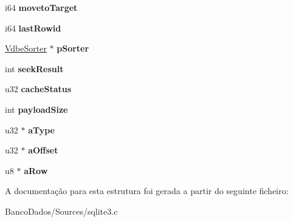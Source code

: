 \begin{DoxyCompactItemize}
\item 
\hypertarget{struct_vdbe_cursor_af3c157d480c0597ba50aca227eb8e3b8}{i64 {\bfseries moveto\-Target}}\label{struct_vdbe_cursor_af3c157d480c0597ba50aca227eb8e3b8}

\item 
\hypertarget{struct_vdbe_cursor_af2ff971acc308c012c60b1e949c64411}{i64 {\bfseries last\-Rowid}}\label{struct_vdbe_cursor_af2ff971acc308c012c60b1e949c64411}

\item 
\hypertarget{struct_vdbe_cursor_a7e9030a9f4ff8f8161a78dae28a1fe3b}{\hyperlink{struct_vdbe_sorter}{Vdbe\-Sorter} $\ast$ {\bfseries p\-Sorter}}\label{struct_vdbe_cursor_a7e9030a9f4ff8f8161a78dae28a1fe3b}

\item 
\hypertarget{struct_vdbe_cursor_a5eff86e2a9c87dc15956ad362aa03f05}{int {\bfseries seek\-Result}}\label{struct_vdbe_cursor_a5eff86e2a9c87dc15956ad362aa03f05}

\item 
\hypertarget{struct_vdbe_cursor_acf243b5a94a6e5a11341d6fece473c00}{u32 {\bfseries cache\-Status}}\label{struct_vdbe_cursor_acf243b5a94a6e5a11341d6fece473c00}

\item 
\hypertarget{struct_vdbe_cursor_a5c1fa124d7f27a30e14ef0f455955cab}{int {\bfseries payload\-Size}}\label{struct_vdbe_cursor_a5c1fa124d7f27a30e14ef0f455955cab}

\item 
\hypertarget{struct_vdbe_cursor_a6992d2bf9eb8480985aec47dae58f1ab}{u32 $\ast$ {\bfseries a\-Type}}\label{struct_vdbe_cursor_a6992d2bf9eb8480985aec47dae58f1ab}

\item 
\hypertarget{struct_vdbe_cursor_a17431e67b341282aeb6c026cd01ec1e9}{u32 $\ast$ {\bfseries a\-Offset}}\label{struct_vdbe_cursor_a17431e67b341282aeb6c026cd01ec1e9}

\item 
\hypertarget{struct_vdbe_cursor_a6bd10979ffb5d4828967eea1d6e0d2c8}{u8 $\ast$ {\bfseries a\-Row}}\label{struct_vdbe_cursor_a6bd10979ffb5d4828967eea1d6e0d2c8}

\end{DoxyCompactItemize}


A documentação para esta estrutura foi gerada a partir do seguinte ficheiro\-:\begin{DoxyCompactItemize}
\item 
Banco\-Dados/\-Sources/sqlite3.\-c\end{DoxyCompactItemize}
